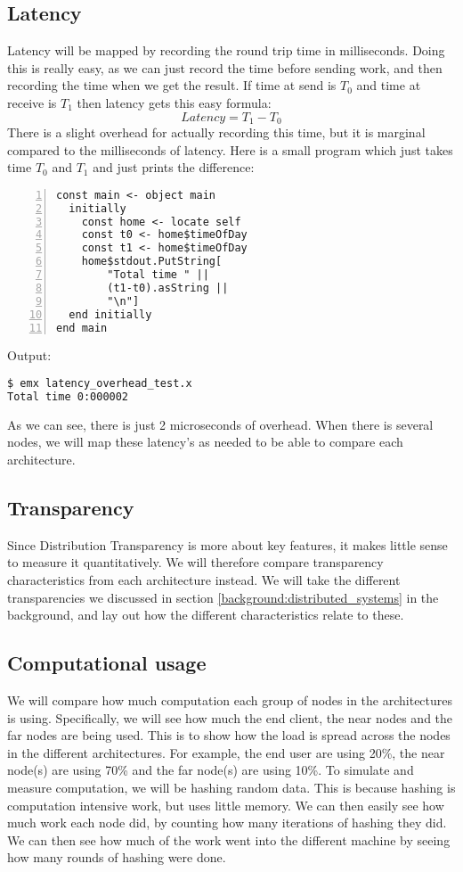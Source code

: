\subsection{Latency}
Latency will be mapped by recording the round trip time in milliseconds. Doing this is really easy, as we can just record the time before sending work, and then recording the time when we get the result. If time at send is $T_0$ and time at receive is $T_1$ then latency gets this easy formula:
\[Latency=T_1-T_0\]
There is a slight overhead for actually recording this time, but it is marginal compared to the milliseconds of latency. Here is a small program which just takes time $T_0$ and $T_1$ and just prints the difference:
\begin{lstlisting}[language=emerald, numbers=left]
const main <- object main
  initially
    const home <- locate self
    const t0 <- home$timeOfDay
    const t1 <- home$timeOfDay
    home$stdout.PutString[
        "Total time " || 
        (t1-t0).asString ||
        "\n"]
  end initially
end main
\end{lstlisting}
Output:
\begin{lstlisting}[language=Bash]
$ emx latency_overhead_test.x
Total time 0:000002
\end{lstlisting}
As we can see, there is just 2 microseconds of overhead.
When there is several nodes, we will map these latency's as needed to be able to compare each architecture.


\subsection{Transparency}
Since Distribution Transparency is more about key features, it makes little sense to measure it quantitatively. We will therefore compare transparency characteristics from each architecture instead. We will take the different transparencies we discussed in section \ref{background:distributed_systems} in the background, and lay out how the different characteristics relate to these.


\subsection{Computational usage}
We will compare how much computation each group of nodes in the architectures is using. Specifically, we will see how much the end client, the near nodes and the far nodes are being used. This is to show how the load is spread across the nodes in the different architectures. For example, the end user are using 20\%, the near node(s) are using 70\% and the far node(s) are using 10\%.
To simulate and measure computation, we will be hashing random data. This is because hashing is computation intensive work, but uses little memory. We can then easily see how much work each node did, by counting how many iterations of hashing they did. We can then see how much of the work went into the different machine by seeing how many rounds of hashing were done.

